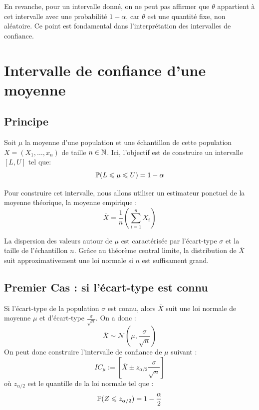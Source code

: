 En revanche, pour un intervalle donné, on ne peut pas affirmer que $\theta$ appartient à cet 
intervalle avec une probabilité $1 - \alpha$, car $\theta$ est une quantité fixe, non aléatoire. 
Ce point est fondamental dans l’interprétation des intervalles de confiance.



\section{Intervalle de confiance d'une moyenne}

\subsection{Principe}

Soit $\mu$ la moyenne d'une population et une échantillon de cette population $X = (X_1, \dots, x_n)$ de 
taille $n \in \mathbb{N}$. 
Ici, l'objectif est de construire un intervalle $[L,U]$ tel que: 
    \[ \mathbb{P}(L \leqslant \mu \leqslant U) = 1 - \alpha \] 

Pour construire cet intervalle, nous allons utiliser un estimateur ponctuel 
de la moyenne théorique, la moyenne empirique :
    \[ \overline{X} = \frac{1}{n} \left( \sum_{i=1}^{n} X_i \right) \] 

La dispersion des valeurs autour de $\mu$ est caractérisée par l'écart-type $\sigma$ et la taille de l'échantillon $n$. 
Grâce au théorème central limite, la distribution de $\overline{X}$ suit approximativement une loi normale si $n$ est 
suffisament grand. 

\subsection{Premier Cas : si l'écart-type est connu}

Si l'écart-type de la population $\sigma$ est connu, alors $\overline{X}$ suit une loi normale de moyenne $\mu$ et 
d'écart-type $\frac{\sigma}{\sqrt{n}}$. On a donc : 
    \[ \overline{X} \sim \mathcal{N}\left(\mu, \frac{\sigma}{\sqrt{n}}\right) \] 
On peut donc construire l'intervalle de confiance de $\mu$ suivant : 
    \[ \boxed{IC_\mu := \left[ \overline{X} \pm z_{\alpha/2} \frac{\sigma}{\sqrt{n}}\right]} \] 
où $ z_{\alpha/2}$ est le quantille de la loi normale tel que :
    \[ \mathbb{P}(Z \leqslant z_{\alpha/2}) = 1 - \frac{\alpha}{2} \] 

